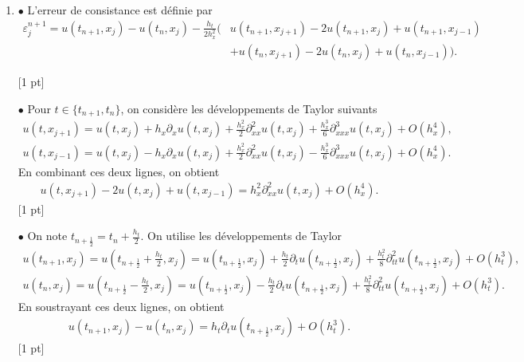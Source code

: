 \documentclass[12pt]{article}
\begin{document}
\begin{cor}
\begin{enumerate}
    Il reste \`a prouver $\calA_j(k) \geq -1$. Pour cela, on \'etudie $\calA_j(k) + 1$
    \begin{align*}
      \calA_j(k) + 1
      &= \dfrac{1 + \dfrac{h_t}{h_x^2} \Big( \cos(2 \pi k h_x) - 1 \Big)}{1 - \dfrac{h_t}{h_x^2} \Big( \cos(2 \pi k h_x) - 1 \Big)} + 1
      \\
      &= \dfrac{2}{1 - \dfrac{h_t}{h_x^2} \Big( \cos(2 \pi k h_x) - 1 \Big)} \geq 0 .
    \end{align*}
    Ainsi, on a bien $\calA_j(k) \geq -1$. Et donc $| \calA_j(k) | \leq 1$.

    Le sch\'ema est donc inconditionnellement stable au sens de Von Neumann.

    
    [2 pts]

  \item
    $\bullet$ L'erreur de consistance est d\'efinie par
    \begin{align*}
      \varepsilon_j^{n+1} = u(t_{n+1}, x_j) - u(t_n,x_j) - \frac{h_t}{2 h_x^2}
      \Big(& u(t_{n+1}, x_{j+1}) - 2 u(t_{n+1}, x_{j}) + u(t_{n+1}, x_{j-1})
      \\
      &+ u(t_{n}, x_{j+1}) - 2 u(t_{n}, x_{j}) + u(t_{n}, x_{j-1}) \Big) .
    \end{align*}

    [1 pt]
    
    $\bullet$ Pour $t \in \{t_{n+1} , t_n \}$, on consid\`ere les d\'eveloppements de Taylor suivants
    \begin{align*}
      u(t,x_{j+1}) = u(t,x_j) + h_x \partial_x u(t,x_j) + \frac{h_x^2}{2} \partial_{xx}^2 u(t,x_j)
      + \frac{h_x^3}{6} \partial_{xxx}^3 u(t,x_j) + O(h_x^4) ,
      \\
      u(t,x_{j-1}) = u(t,x_j) - h_x \partial_x u(t,x_j) + \frac{h_x^2}{2} \partial_{xx}^2 u(t,x_j)
      - \frac{h_x^3}{6} \partial_{xxx}^3 u(t,x_j) + O(h_x^4) .
    \end{align*}
    En combinant ces deux lignes, on obtient
    \begin{align*}
      u(t, x_{j+1}) - 2 u(t, x_{j}) + u(t, x_{j-1})
      =
      h_x^2 \partial_{xx}^2 u(t,x_j) + O(h_x^4) .
    \end{align*}
    [1 pt]

    $\bullet$ On note $t_{n+\frac12} = t_n + \frac{h_t}2$.
    On utilise les d\'eveloppements de Taylor
    \begin{align*}
      u(t_{n+1} , x_j) = u(t_{n+\frac12} + \frac{h_t}{2}, x_j)
      = u(t_{n+\frac12}, x_j) + \frac{h_t}{2} \partial_t u(t_{n+\frac12}, x_j)
      + \frac{h_t^2}{8} \partial_{tt}^2 u(t_{n+\frac12}, x_j) + O(h_t^3) ,
      \\
      u(t_{n} , x_j) = u(t_{n+\frac12} - \frac{h_t}{2}, x_j)
      = u(t_{n+\frac12}, x_j) - \frac{h_t}{2} \partial_t u(t_{n+\frac12}, x_j)
      + \frac{h_t^2}{8} \partial_{tt}^2 u(t_{n+\frac12}, x_j) + O(h_t^3) .
    \end{align*}
    En soustrayant ces deux lignes, on obtient
    \begin{align*}
      u(t_{n+1} , x_j) - u(t_{n} , x_j) = h_t \partial_t u(t_{n+\frac12}, x_j) + O(h_t^3) .
    \end{align*}
    [1 pt]


\end{enumerate}
\end{cor}
\end{document}
